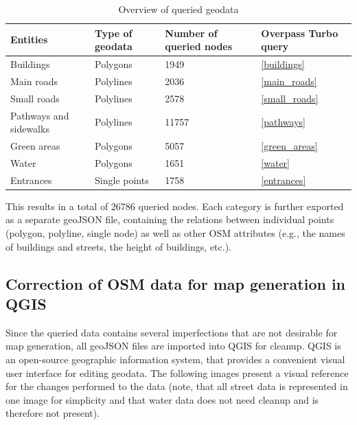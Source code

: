 \begin{table}[!ht]
	\small
	\centering
	\begin{tabular}{|l|l|l|l|}
		\hline
		Entities                & Type of geodata       & Number of queried nodes       & Overpass Turbo query \\
		\hline
        Buildings               & Polygons              & 1949                          & \ref{buildings} \\
		\hline
		Main roads              & Polylines             & 2036                          & \ref{main_roads} \\
		\hline
		Small roads             & Polylines             & 2578                          & \ref{small_roads} \\
		\hline
		Pathways and sidewalks  & Polylines             & 11757                         & \ref{pathways} \\
		\hline
        Green areas             & Polygons              & 5057                          & \ref{green_areas} \\
		\hline
        Water                   & Polygons              & 1651                          & \ref{water} \\
		\hline
        Entrances               & Single points         & 1758                          & \ref{entrances} \\
		\hline
	\end{tabular}
	\caption{Overview of queried geodata}
\end{table}

This results in a total of 26786 queried nodes. Each category is further exported as a separate geoJSON file, containing the relations between individual points (polygon, polyline, single node) as well as other OSM attributes (e.g., the names of buildings and streets, the height of buildings, etc.).

\subsection{Correction of OSM data for map generation in QGIS}
Since the queried data contains several imperfections that are not desirable for map generation, all geoJSON files are imported into QGIS for cleanup. QGIS is an open-source geographic information system, that provides a convenient visual user interface for editing geodata. The following images present a visual reference for the changes performed to the data (note, that all street data is represented in one image for simplicity and that water data does not need cleanup and is therefore not present).

